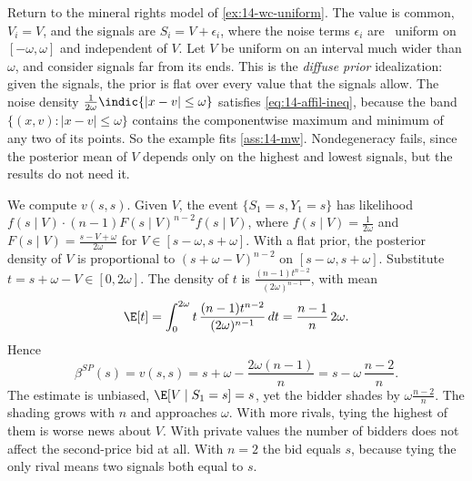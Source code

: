 \begin{example}\label{ex:14-mineral}
Return to the mineral rights model of \cref{ex:14-wc-uniform}. The value is common, $V_i=V$, and the
signals are $S_i=V+\epsilon_i$, where the noise terms $\epsilon_i$ are \iid\ uniform on $[-\omega,\omega]$
and independent of $V$. Let $V$ be uniform on an interval much wider
than $\omega$, and consider signals far from its ends. This is the \emph{diffuse prior} idealization: given
the signals, the prior is flat over every value that the signals allow. The noise density
$\frac{1}{2\omega}\indic\{|x-v|\le\omega\}$ satisfies \eqref{eq:14-affil-ineq}, because the band
$\{(x,v):|x-v|\le\omega\}$ contains the componentwise maximum and minimum of any two of its points. So the
example fits \cref{ass:14-mw}. Nondegeneracy fails, since the posterior mean of $V$ depends only on the
highest and lowest signals, but the results do not need it.

We compute $v(s,s)$. Given $V$, the event $\{S_1=s,Y_1=s\}$ has likelihood
$f(s\mid V)\cdot(n-1)F(s\mid V)^{n-2}f(s\mid V)$, where $f(s\mid V)=\frac{1}{2\omega}$ and
$F(s\mid V)=\frac{s-V+\omega}{2\omega}$ for $V\in[s-\omega,s+\omega]$. With a flat prior, the posterior
density of $V$ is proportional to $(s+\omega-V)^{n-2}$ on $[s-\omega,s+\omega]$. Substitute
$t=s+\omega-V\in[0,2\omega]$. The density of $t$ is $\frac{(n-1)t^{n-2}}{(2\omega)^{n-1}}$, with mean
\begin{equation*}
  \E[t]=\int_0^{2\omega}t\,\frac{(n-1)t^{n-2}}{(2\omega)^{n-1}}\,dt=\frac{n-1}{n}\,2\omega.
\end{equation*}
Hence
\begin{equation}\label{eq:14-mineral-spa}
  \beta^{SP}(s)=v(s,s)=s+\omega-\frac{2\omega(n-1)}{n}=s-\omega\,\frac{n-2}{n}.
\end{equation}
The estimate is unbiased, $\E[V\mid S_1=s]=s$, yet the bidder shades by $\omega\frac{n-2}{n}$. The shading
grows with $n$ and approaches $\omega$. With more rivals, tying the highest of them is worse news about $V$.
With private values the number of bidders does not affect the second-price bid at all. With $n=2$ the
bid equals $s$, because tying the only rival means two signals both equal to $s$.
\end{example}

